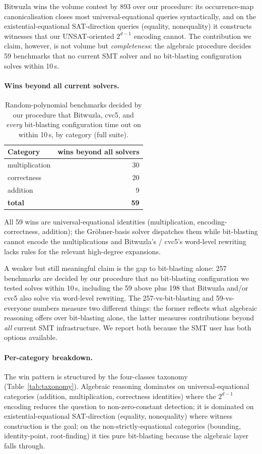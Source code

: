 \documentclass[runningheads]{llncs}
\begin{document}
Bitwuzla wins the volume contest by 893 over our procedure: its
occurrence-map canonicalisation closes most universal-equational
queries syntactically, and on the existential-equational
SAT-direction queries (equality, nonequality) it constructs
witnesses that our UNSAT-oriented $2^{d-1}$ encoding cannot.
The contribution we claim, however, is not volume but
\emph{completeness}: the algebraic procedure decides 59 benchmarks
that no current SMT solver and no bit-blasting configuration
solves within 10\,s.

\paragraph{Wins beyond all current solvers.}
\begin{table}[ht]
\caption{Random-polynomial benchmarks decided by our procedure
that Bitwuzla, cvc5, and \emph{every} bit-blasting configuration
time out on within 10\,s, by category (full suite).}
\label{tab:random-poly-wins}
\centering
\small
\begin{tabular}{lr}
\toprule
Category & wins beyond all solvers \\
\midrule
multiplication & 30 \\
correctness    & 20 \\
addition       & 9 \\
\midrule
\textbf{total} & \textbf{59} \\
\bottomrule
\end{tabular}
\end{table}

All 59 wins are universal-equational identities (multiplication,
encoding-correctness, addition); the Gr\"obner-basis solver
dispatches them while bit-blasting cannot encode the
multiplications and Bitwuzla's / cvc5's word-level rewriting
lacks rules for the relevant high-degree expansions.

A weaker but still meaningful claim is the gap to bit-blasting
alone: 257 benchmarks are decided by our procedure that no
bit-blasting configuration we tested solves within 10\,s,
including the 59 above plus 198 that Bitwuzla and/or cvc5 also
solve via word-level rewriting. The 257-vs-bit-blasting and
59-vs-everyone numbers measure two different things: the former
reflects what algebraic reasoning offers over bit-blasting
alone, the latter measures contributions beyond \emph{all}
current SMT infrastructure. We report both because the SMT user
has both options available.

\paragraph{Per-category breakdown.}
The win pattern is structured by the four-classes taxonomy
(Table~\ref{tab:taxonomy}). Algebraic reasoning dominates on
universal-equational categories (addition, multiplication,
correctness identities) where the $2^{d-1}$ encoding reduces
the question to non-zero-constant detection; it is dominated on
existential-equational SAT-direction (equality, nonequality)
where witness construction is the goal; on the
non-strictly-equational categories (bounding, identity-point,
root-finding) it ties pure bit-blasting because the algebraic
layer falls through.
\end{document}
